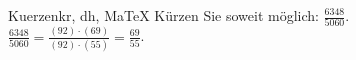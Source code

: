 \begin{MAufgabe}{Kuerzen}{kr, dh, MaTeX}
K\"urzen Sie soweit m\"oglich: $\frac{6348}{5060}$.\\ 
\ifLsg\MLoesung
\quad $\frac{6348}{5060}=\frac{(92)\cdot(69)}{(92)\cdot(55)}=\frac{69}{55}$.\else\relax\fi
 \end{MAufgabe}